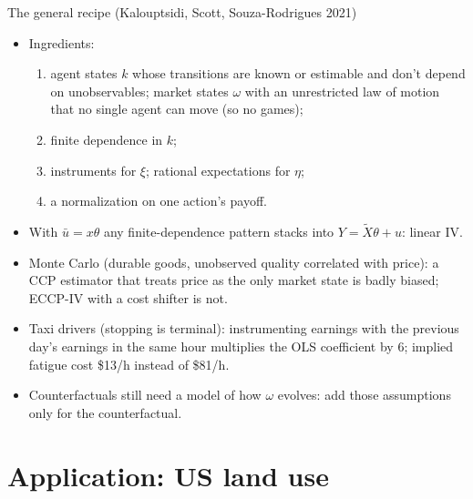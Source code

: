\documentclass[aspectratio=169,11pt]{beamer}
\begin{document}
\begin{frame}{The general recipe (Kalouptsidi, Scott, Souza-Rodrigues 2021)}
\small
\begin{itemize}
\item Ingredients:
\begin{enumerate}
\item agent states $k$ whose transitions are known or estimable and don't depend on unobservables; market states $\omega$ with an unrestricted law of motion that no single agent can move (so \alert{no games});
\item finite dependence in $k$;
\item instruments for $\xi$; rational expectations for $\eta$;
\item a normalization on one action's payoff.
\end{enumerate}
\item With $\bar u = x\theta$ any finite-dependence pattern stacks into $Y = \tilde X\theta + u$: linear IV.
\item Monte Carlo (durable goods, unobserved quality correlated with price): a CCP estimator that treats price as the only market state is badly biased; ECCP-IV with a cost shifter is not.
\item Taxi drivers (stopping is terminal): instrumenting earnings with the previous day's earnings in the same hour multiplies the OLS coefficient by 6; implied fatigue cost \$13/h instead of \$81/h.
\item Counterfactuals still need a model of how $\omega$ evolves: add those assumptions only for the counterfactual.
\end{itemize}
\end{frame}

\section{Application: US land use}
\end{document}

